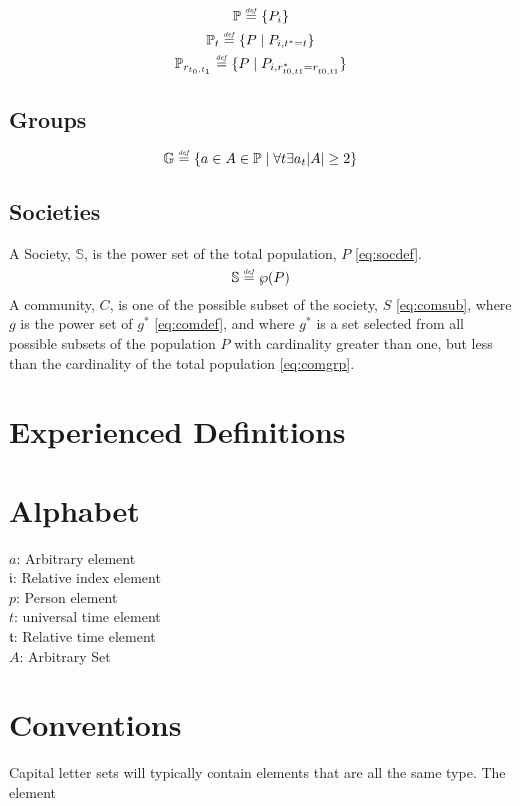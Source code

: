 \documentclass[]{article}
\newcommand{\defeq}{\stackrel{\smash{\scriptscriptstyle\mathit{def}}}{=}}
\begin{document}
\begin{equation} \label{eq:population} 
\mathbb{P} \defeq \{ P_{i} \} 
\end{equation}
\begin{equation} \label{eq:population_time} 
\mathbb{P}_{t} \defeq \{ P \mid P_{i,t^{*}=t} \} 
\end{equation}
\begin{equation} \label{eq:population_range} 
\mathbb{P}_{r_{t_{0},t_{1}}} \defeq \{ P \mid P_{i,r^{*}_{t0,t1}=r^{ }_{t0,t1}} \} 
\end{equation}
%
\subsection*{Groups}
\begin{equation} \label{eq:comgrp} \mathbb{G} \defeq \{ a \in A \in \mathbb{P} \mid \forall t\exists a_{t}|A| \geq 2 \} \end{equation}
\subsection*{Societies}
%
A Society, $\mathbb{S}$, is the power set of the total population, $P$ \eqref{eq:socdef}.
\begin{equation} \label{eq:socdef} \mathbb{S} \defeq \wp(P) \end{equation}
%
A community, $C$, is one of the possible subset of the society, $S$ \eqref{eq:comsub}, where $g$ is the power set of $g^{*}$ \eqref{eq:comdef}, and where $g^{*}$ is a set selected from all possible subsets of the population $P$ with cardinality greater than one, but less than the cardinality of the total population \eqref{eq:comgrp}.
 
%
\section*{Experienced Definitions}
\section*{Alphabet}
$a$: Arbitrary element \\
$\mathfrak{i}$: Relative index element \\
$p$: Person element \\
$t$: universal time element \\
$\mathfrak{t}$: Relative time element \\
$A$: Arbitrary Set \\

\section*{Conventions}
Capital letter sets will typically contain elements that are all the same type. The element 
\end{document}
